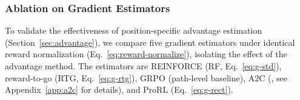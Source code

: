 \documentclass{llmxive}
\begin{document}
\begin{table}[t!]
\centering
\caption{{Analysis of gradient estimators on ML-1M. We report final performance, average path length at training Epochs 1, 5, 10, and advantage variance (normalized to Epoch~1 of RF).}}
\label{tab:stability}
\end{table}





\subsubsection{Ablation on Gradient Estimators}
\label{sec:ablation_gradient}

To validate the effectiveness of position-specific advantage estimation (Section~\ref{sec:advantage}), we compare five gradient estimators under identical reward normalization (Eq.~\eqref{eq:reward-normalize}), isolating the effect of the advantage method. The estimators are REINFORCE (RF, Eq.~\eqref{eq:g-std}), reward-to-go (RTG, Eq.~\eqref{eq:g-rtg}), GRPO (path-level baseline), A2C (\citet{pmlr-v48-mniha16}, see Appendix~\ref{app:a2c} for details), and ProRL (Eq.~\eqref{eq:g-rect}).
\end{document}
